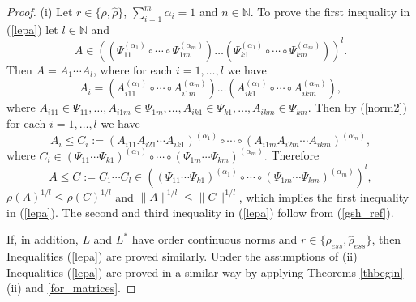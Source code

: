 \documentclass[12pt, reqno]{amsart}
\theoremstyle{definition}
\theoremstyle{remark}
\numberwithin{equation}{section}
\newcommand{\NN}{\mathbb{N}}
\begin{document}
\begin{proof} (i) Let  $r \in \{\rho, \hat{\rho}\}$, $\sum _{i=1} ^m \alpha _i = 1$ and $n \in \NN$. To prove the first inequality in (\ref{lepa}) let $l\in \NN$ and 
$$A \in \left(\left(\Psi_{1 1}^{(\alpha _1)} \circ \cdots \circ \Psi_{1 m}^{(\alpha _m)}\right) \ldots \left(\Psi_{k 1}^{(\alpha _1)} \circ \cdots \circ \Psi_{k m}^{(\alpha _m)} \right)\right)^l.$$
Then $A=A_1 \cdots A_l$, where for each $i=1, \ldots , l$ we have
$$A_i = \left(A_{i1 1}^{(\alpha _1)} \circ \cdots \circ A_{i 1 m}^{(\alpha _m)}\right) \ldots \left(A_{i k 1}^{(\alpha _1)} \circ \cdots \circ A_{i k m}^{(\alpha _m)} \right),$$
where $A_{i1 1} \in \Psi_{1 1}, \ldots , A_{i1 m} \in \Psi_{1 m}, \ldots , A_{ik 1} \in \Psi_{k 1}, \ldots , A_{ikm} \in \Psi_{km}. $ 
Then by (\ref{norm2}) for each $i=1, \ldots , l$ we have
$$A_i \le C_i := (A_{i11}A_{i21} \cdots A_{ik1} )^{(\alpha_1)} \circ \cdots \circ (A_{i1m}A_{i2m} \cdots A_{ikm} )^{(\alpha_m)}, $$
where $C_i \in (\Psi_{1 1} \cdots  \Psi_{k 1})^{(\alpha _1)} \circ \cdots
\circ (\Psi_{1 m} \cdots \Psi_{k m})^{(\alpha _m)}.$ Therefore 
$$A \le C:=C_1 \cdots C_l \in \left((\Psi_{1 1} \cdots  \Psi_{k 1})^{(\alpha _1)} \circ \cdots
\circ (\Psi_{1 m} \cdots \Psi_{k m})^{(\alpha _m)}\right)^l,$$
$\rho(A)^{1/l}\le \rho(C)^{1/l}$ and $\|A\|^{1/l}\le \|C\|^{1/l}$, which implies the first inequality in (\ref{lepa}). The second and third inequality in (\ref{lepa}) follow from  (\ref{gsh_ref}).

If, in addition, $L$ and $L^*$ have order continuous norms and $r\in \{ \rho _{ess}, \hat{\rho} _{ess}\}$, then Inequalities (\ref{lepa}) are proved similarly. Under the assumptions of (ii) Inequalities (\ref{lepa}) are proved in a similar way by applying Theorems \ref{thbegin}(ii) and \ref{for_matrices}.
\end{proof}
\end{document}
